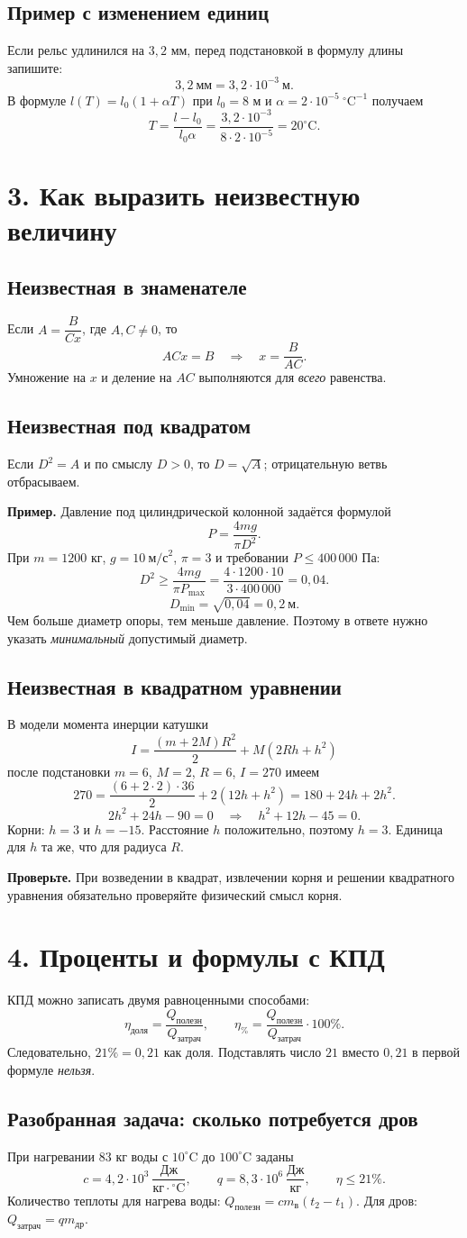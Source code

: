 \documentclass[a4paper,11pt]{article}
\newcommand{\topic}[1]{\section*{\textcolor{darkaccent}{#1}}}
\newcommand{\subtopic}[1]{\subsection*{\textcolor{accent}{#1}}}
\newcommand{\note}[1]{\textcolor{mute}{\textbf{Проверьте.}} #1}
\newcommand{\ex}[1]{\textbf{Пример.} #1}
\begin{document}
\subtopic{Пример с изменением единиц}
Если рельс удлинился на $3{,}2$ мм, перед подстановкой в формулу длины запишите:
\[
3{,}2\ \text{мм}=3{,}2\cdot10^{-3}\ \text{м}.
\]
В формуле $l(T)=l_0(1+\alpha T)$ при $l_0=8$ м и $\alpha=2\cdot10^{-5}\ ^\circ\!\text{C}^{-1}$ получаем
\[
T=\frac{l-l_0}{l_0\alpha}
=\frac{3{,}2\cdot10^{-3}}{8\cdot2\cdot10^{-5}}
=20^\circ\!\text{C}.
\]

\clearpage
\topic{3. Как выразить неизвестную величину}

\subtopic{Неизвестная в знаменателе}
Если $A=\dfrac{B}{Cx}$, где $A,C\ne0$, то
\[
ACx=B \quad\Longrightarrow\quad x=\frac{B}{AC}.
\]
Умножение на $x$ и деление на $AC$ выполняются для \emph{всего} равенства.

\subtopic{Неизвестная под квадратом}
Если $D^2=A$ и по смыслу $D>0$, то $D=\sqrt A$; отрицательную ветвь отбрасываем.

\ex{Давление под цилиндрической колонной задаётся формулой}
\[
P=\frac{4mg}{\pi D^2}.
\]
При $m=1200$ кг, $g=10\ \text{м/с}^2$, $\pi=3$ и требовании $P\le400\,000$ Па:
\[
D^2\ge\frac{4mg}{\pi P_{\max}}
=\frac{4\cdot1200\cdot10}{3\cdot400\,000}
=0{,}04.
\]
\[
\boxed{D_{\min}=\sqrt{0{,}04}=0{,}2\ \text{м}.}
\]
Чем больше диаметр опоры, тем меньше давление. Поэтому в ответе нужно указать \emph{минимальный} допустимый диаметр.

\subtopic{Неизвестная в квадратном уравнении}
В модели момента инерции катушки
\[
I=\frac{(m+2M)R^2}{2}+M(2Rh+h^2)
\]
после подстановки $m=6$, $M=2$, $R=6$, $I=270$ имеем
\[
270=\frac{(6+2\cdot2)\cdot36}{2}+2(12h+h^2)
=180+24h+2h^2.
\]
\[
2h^2+24h-90=0\quad\Longrightarrow\quad
h^2+12h-45=0.
\]
Корни: $h=3$ и $h=-15$. Расстояние $h$ положительно, поэтому \textbf{$h=3$}. Единица для $h$ та же, что для радиуса $R$.

\note{При возведении в квадрат, извлечении корня и решении квадратного уравнения обязательно проверяйте физический смысл корня.}

\clearpage
\topic{4. Проценты и формулы с КПД}

КПД можно записать двумя равноценными способами:
\[
\eta_{\text{доля}}=\frac{Q_{\text{полезн}}}{Q_{\text{затрач}}},
\qquad
\eta_{\%}=\frac{Q_{\text{полезн}}}{Q_{\text{затрач}}}\cdot100\%.
\]
Следовательно, $21\%=0{,}21$ как доля. Подставлять число $21$ вместо $0{,}21$ в первой формуле \emph{нельзя}.

\subtopic{Разобранная задача: сколько потребуется дров}
При нагревании $83$ кг воды с $10^\circ\text{C}$ до $100^\circ\text{C}$ заданы
\[
c=4{,}2\cdot10^3\ \frac{\text{Дж}}{\text{кг}\cdot{}^\circ\!\text{C}},
\qquad q=8{,}3\cdot10^6\ \frac{\text{Дж}}{\text{кг}},
\qquad\eta\le21\%.
\]
Количество теплоты для нагрева воды: $Q_{\text{полезн}}=cm_{\text{в}}(t_2-t_1)$. Для дров: $Q_{\text{затрач}}=qm_{\text{др}}$.
\end{document}
